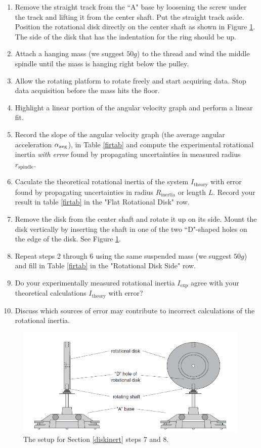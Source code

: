 \label{diskinert}
\begin{enumerate}
	\item Remove the straight track from the ``A" base by loosening the screw under the track and lifting it from the center shaft.  Put the straight track aside.  Position the rotational disk directly on the center shaft as shown in Figure \ref{fig:rotinertias}.  The side of the disk that has the indentation for the ring should be up.
	\item Attach a hanging mass (we suggest $50g$) to the thread and wind the middle spindle until the mass is hanging right below the pulley.
	\item Allow the rotating platform to rotate freely and start acquiring data.  Stop data acquisition before the mass hits the floor.
	\item Highlight a linear portion of the angular velocity graph and perform a linear fit.
	\item Record the slope of the angular velocity graph (the average angular acceleration $\alpha _{\rm avg}$), in Table \ref{firtab} and compute the experimental rotational inertia {\it{with error}} found by propagating uncertainties in measured radius $r_\text{spindle}$.
\item Caculate the theoretical rotational inertia of the system $I_\text{theory}$ with error found by propagating uncertainties in radius $R_\text{inertia}$ or length $L$. Record your result in table \ref{firtab} in the "Flat Rotational Disk" row.
	\item Remove the disk from the center shaft and rotate it up on its side.  Mount the disk vertically by inserting the shaft in one of the two ``D"-shaped holes on the edge of the disk.  See Figure \ref{fig:rotinertias}.
\item Repeat steps 2 through 6 using the same suspended mass (we suggest $50g$) and fill in Table \ref{firtab} in the "Rotational Disk Side" row.
\item Do your experimentally measured rotational inertia $I_\text{exp}$ agree with your theoretical calculations $I_\text{theory}$ with error? 
\item Discuss which sources of error may contribute to incorrect calculations of the rotational inertia.
\end{enumerate}

\begin{figure}[!h]
	\begin{center}
		\includegraphics[width=0.8\linewidth]{./Exp6/pic/crazyfig.png}
	\end{center}
	\caption{The setup for Section \ref{diskinert} steps 7 and 8.}
	\label{fig:rotinertias}
\end{figure}


